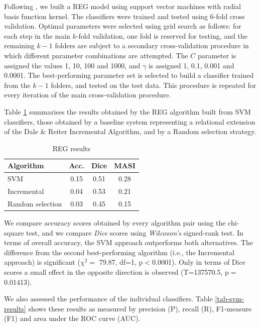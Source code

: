 \documentclass[11pt]{article}
\begin{document}
Following \cite{thiago-svm}, we built a REG model using support vector machines with radial basis function kernel. The classifiers were trained and tested using 6-fold cross validation. Optimal parameters were selected using grid search as follows: for each step in the main $k$-fold validation, one fold is reserved for testing, and the remaining $k-1$ folders are subject  to a secondary cross-validation procedure in which different parameter combinations are attempted. The $C$ parameter is assigned the values 1, 10, 100 and 1000, and $\gamma$ is assigned 1, 0.1, 0.001 and 0.0001. The best-performing parameter set is selected to build a classifier trained from the $k-1$ folders, and tested on the test data. This procedure is repeated for every iteration of the main cross-validation procedure.

Table \ref{tab-reg-results} summarises the results obtained by the REG algorithm built from SVM classifiers, those obtained by a baseline system representing a relational extension of the Dale \& Reiter Incremental Algorithm, and by a Random selection strategy.  

\begin{table}[ht]
\begin{center}
\caption{REG results}
\label{tab-reg-results}
\footnotesize{
\begin{tabular} {  l c c c }
\hline
{Algorithm}							& {Acc.} 	& { Dice}		& MASI \\ \hline 
SVM											& 0.15		&	0.51			& 0.28 \\
Incremental							& 0.04		&	0.53			& 0.21 \\
Random selection       	& 0.03    & 0.45      & 0.15 \\
\hline
\end{tabular}
}
\end{center}
\end{table}
\normalsize

We compare accuracy scores obtained by every algorithm pair using the chi-square test, and we compare {\em Dice} scores using {\em Wilcoxon's} signed-rank test. In terms of overall accuracy, the SVM approach outperforms both alternatives. The difference from the second best-performing algorithm (i.e., the Incremental approach) is significant ($\chi^{2}=$ 79.87, df=1, p$<$0.0001). Only in terms of Dice scores a small effect in the opposite direction is observed (T=137570.5, p$=$ 0.01413). 

We also assessed the performance of the individual classifiers. Table \ref{tab-svm-results} shows these results as measured by precision (P), recall (R), F1-measure (F1) and area under the ROC curve (AUC). 
\end{document}
